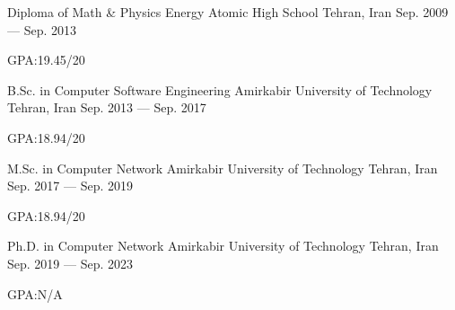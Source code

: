 

\begin{cventries}

  \cventry
    {Diploma of Math \& Physics} %
    {Energy Atomic High School} %
    {Tehran, Iran} %
    {Sep. 2009 --- Sep. 2013} %
    {
      \begin{cvitems} %
        \item {GPA:\@ 19.45/20}
      \end{cvitems}
    }


  \cventry
    {B.Sc. in Computer Software Engineering} %
    {Amirkabir University of Technology} %
    {Tehran, Iran} %
    {Sep. 2013 --- Sep. 2017} %
    {
      \begin{cvitems} %
        \item {GPA:\@ 18.94/20}
      \end{cvitems}
    }


  \cventry
    {M.Sc. in Computer Network} %
    {Amirkabir University of Technology} %
    {Tehran, Iran} %
    {Sep. 2017 --- Sep. 2019} %
    {
      \begin{cvitems} %
        \item {GPA:\@ 18.94/20}
      \end{cvitems}
    }


  \cventry
    {Ph.D. in Computer Network} %
    {Amirkabir University of Technology} %
    {Tehran, Iran} %
    {Sep. 2019 --- Sep. 2023} %
    {
      \begin{cvitems} %
        \item {GPA:\@ N/A}
      \end{cvitems}
    }


\end{cventries}

